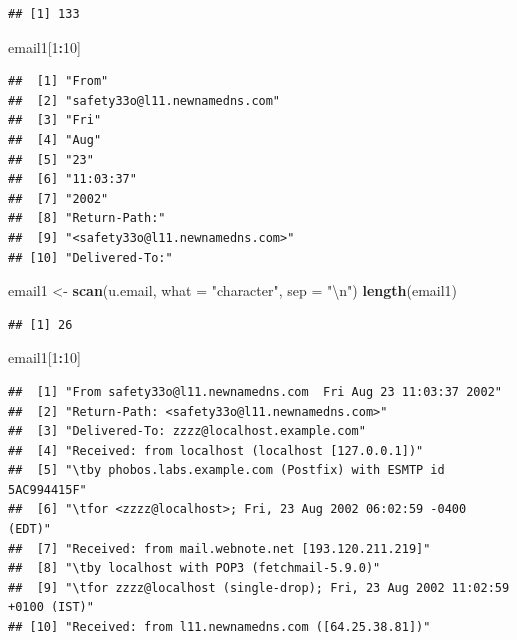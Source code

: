 \documentclass[
]{krantz}
\newenvironment{Shaded}{\begin{snugshade}}{\end{snugshade}}
\newcommand{\CharTok}[1]{\textcolor[rgb]{0.31,0.60,0.02}{#1}}
\newcommand{\DataTypeTok}[1]{\textcolor[rgb]{0.13,0.29,0.53}{#1}}
\newcommand{\DecValTok}[1]{\textcolor[rgb]{0.00,0.00,0.81}{#1}}
\newcommand{\KeywordTok}[1]{\textcolor[rgb]{0.13,0.29,0.53}{\textbf{#1}}}
\newcommand{\NormalTok}[1]{#1}
\newcommand{\OperatorTok}[1]{\textcolor[rgb]{0.81,0.36,0.00}{\textbf{#1}}}
\newcommand{\StringTok}[1]{\textcolor[rgb]{0.31,0.60,0.02}{#1}}
\begin{document}
\begin{verbatim}
## [1] 133
\end{verbatim}

\begin{Shaded}
\begin{Highlighting}[]
\NormalTok{email1[}\DecValTok{1}\OperatorTok{:}\DecValTok{10}\NormalTok{]}
\end{Highlighting}
\end{Shaded}

\begin{verbatim}
##  [1] "From"                          
##  [2] "safety33o@l11.newnamedns.com"  
##  [3] "Fri"                           
##  [4] "Aug"                           
##  [5] "23"                            
##  [6] "11:03:37"                      
##  [7] "2002"                          
##  [8] "Return-Path:"                  
##  [9] "<safety33o@l11.newnamedns.com>"
## [10] "Delivered-To:"
\end{verbatim}

\begin{Shaded}
\begin{Highlighting}[]
\NormalTok{email1 \textless{}{-}}\StringTok{ }\KeywordTok{scan}\NormalTok{(u.email, }\DataTypeTok{what =} \StringTok{"character"}\NormalTok{, }\DataTypeTok{sep =} \StringTok{"}\CharTok{\textbackslash{}n}\StringTok{"}\NormalTok{)}
\KeywordTok{length}\NormalTok{(email1)}
\end{Highlighting}
\end{Shaded}

\begin{verbatim}
## [1] 26
\end{verbatim}

\begin{Shaded}
\begin{Highlighting}[]
\NormalTok{email1[}\DecValTok{1}\OperatorTok{:}\DecValTok{10}\NormalTok{]}
\end{Highlighting}
\end{Shaded}

\begin{verbatim}
##  [1] "From safety33o@l11.newnamedns.com  Fri Aug 23 11:03:37 2002"              
##  [2] "Return-Path: <safety33o@l11.newnamedns.com>"                              
##  [3] "Delivered-To: zzzz@localhost.example.com"                                 
##  [4] "Received: from localhost (localhost [127.0.0.1])"                         
##  [5] "\tby phobos.labs.example.com (Postfix) with ESMTP id 5AC994415F"          
##  [6] "\tfor <zzzz@localhost>; Fri, 23 Aug 2002 06:02:59 -0400 (EDT)"            
##  [7] "Received: from mail.webnote.net [193.120.211.219]"                        
##  [8] "\tby localhost with POP3 (fetchmail-5.9.0)"                               
##  [9] "\tfor zzzz@localhost (single-drop); Fri, 23 Aug 2002 11:02:59 +0100 (IST)"
## [10] "Received: from l11.newnamedns.com ([64.25.38.81])"
\end{verbatim}
\end{document}
